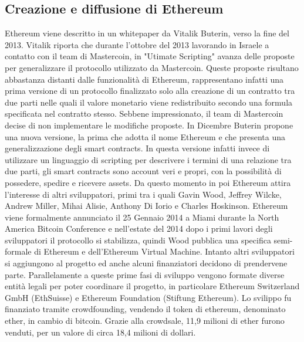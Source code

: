 \subsection{Creazione e diffusione di Ethereum}

Ethereum viene descritto in un whitepaper\cite{K20} da Vitalik Buterin, verso la fine del 2013.
Vitalik riporta che durante l'ottobre del 2013 lavorando in Israele a contatto con il team di Mastercoin, in "Utimate Scripting" avanza delle proposte per generalizzare il protocollo utilizzato da Mastercoin. Queste proposte risultano abbastanza distanti dalle funzionalità di Ethereum, rappresentano infatti una prima versione di un protocollo finalizzato solo alla creazione di un contratto tra due parti nelle quali il valore monetario viene redistribuito secondo una formula specificata nel contratto stesso. Sebbene impressionato, il team di Mastercoin decise di non implementare le modifiche proposte. In Dicembre Buterin propone una nuova versione, la prima che adotta il nome Ethereum e che presenta una generalizzazione degli smart contracts. In questa versione infatti invece di utilizzare un linguaggio di scripting per descrivere i termini di una relazione tra due parti, gli smart contracts sono account veri e propri, con la possibilità di possedere, spedire e ricevere assets\cite{K21}. Da questo momento in poi Ethereum attira l'interesse di altri sviluppatori, primi tra i quali Gavin Wood, Jeffrey Wilcke, Andrew Miller, Mihai Alisie, Anthony Di Iorio e Charles Hoskinson. 
Ethereum viene formalmente annunciato il 25 Gennaio 2014 a Miami durante la North America Bitcoin Conference  e nell'estate del 2014 dopo i primi lavori degli sviluppatori il protocollo si stabilizza, quindi Wood pubblica una specifica semi-formale di Ethereum e dell'Ethereum Virtual Machine\cite{K22}. Intanto altri sviluppatori si aggiungono al progetto ed anche alcuni finanziatori decidono di prendervene parte.
Parallelamente a queste prime fasi di sviluppo vengono formate diverse entità legali per poter coordinare il progetto, in particolare Ethereum Switzerland GmbH (EthSuisse) e Ethereum Foundation (Stiftung Ethereum). Lo svilippo fu finanziato tramite crowdfounding, vendendo il token di ethereum, denominato ether, in cambio di bitcoin. Grazie alla crowdsale, 11,9 milioni di ether furono venduti, per un valore di circa 18,4 milioni di dollari. 

